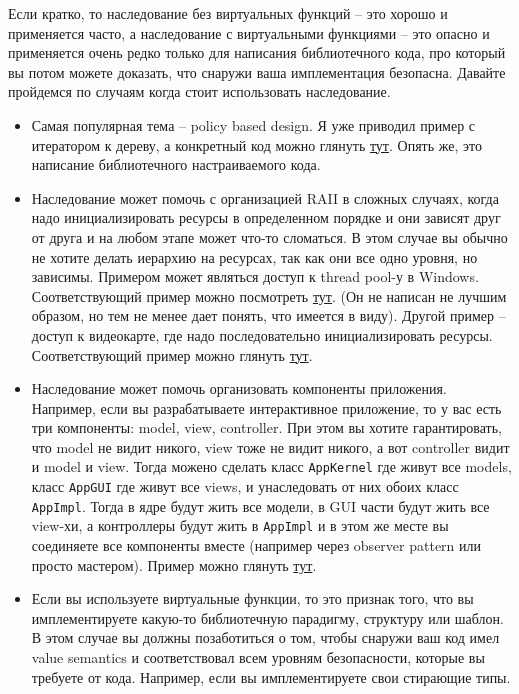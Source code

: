 \documentclass{article}
\begin{document}
Если кратко, то наследование без виртуальных функций -- это хорошо и применяется часто, а наследование с виртуальными функциями -- это опасно и применяется очень редко только для написания библиотечного кода, про который вы потом можете доказать, что снаружи ваша имплементация безопасна. Давайте пройдемся по случаям когда стоит использовать наследование.
\begin{itemize}
\item Самая популярная тема -- policy based design. Я уже приводил пример с итератором к дереву, а конкретный код можно глянуть \href{https://github.com/DimaTrushin/Library/blob/master/StlExtension/VTree.h}{тут}. Опять же, это написание библиотечного настраиваемого кода.

\item Наследование может помочь с организацией RAII в сложных случаях, когда надо инициализировать ресурсы в определенном порядке и они зависят друг от друга и на любом этапе может что-то сломаться. В этом случае вы обычно не хотите делать иерархию на ресурсах, так как они все одно уровня, но зависимы. Примером может являться доступ к thread pool-у в Windows. Соответствующий пример можно посмотреть \href{https://github.com/DimaTrushin/Typing-Analysis-RAD/blob/master/UnitThreadPool.h}{тут}. (Он не написан не лучшим образом, но тем не менее дает понять, что имеется в виду). Другой пример -- доступ к видеокарте, где надо последовательно инициализировать ресурсы. Соответствующий пример можно глянуть \href{https://github.com/DimaTrushin/TypingAnalysis/blob/kernel/Compute/CudaGate.h}{тут}.

\item Наследование может помочь организовать компоненты приложения. Например, если вы разрабатываете интерактивное приложение, то у вас есть три компоненты: model, view, controller. При этом вы хотите гарантировать, что model не видит никого, view тоже не видит никого, а вот controller видит и model и view. Тогда можено сделать класс \verb"AppKernel" где живут все models, класс \verb"AppGUI" где живут все views, и унаследовать от них обоих класс \verb"AppImpl". Тогда в ядре будут жить все модели, в GUI части будут жить все view-хи, а контроллеры будут жить в \verb"AppImpl" и в этом же месте вы соединяете все компоненты вместе (например через observer pattern или просто мастером). Пример можно глянуть \href{https://github.com/DimaTrushin/TypingAnalysis/blob/kernel/ApplicationImpl.h}{тут}.

\item Если вы используете виртуальные функции, то это признак того, что вы имплементируете какую-то библиотечную парадигму, структуру или шаблон. В этом случае вы должны позаботиться о том, чтобы снаружи ваш код имел value semantics и соответствовал всем уровням безопасности, которые вы требуете от кода. Например, если вы имплементируете свои стирающие типы.
\end{itemize}
\end{document}
